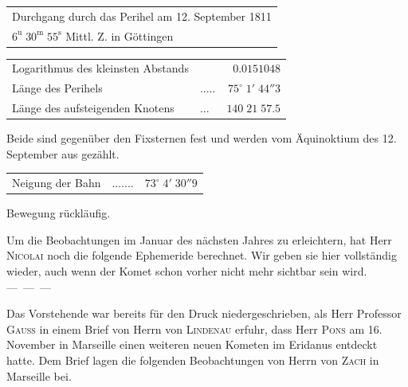 \begin{center}\fontsize{10}{12}\selectfont\setlength{\tabcolsep}{4pt}\renewcommand{\arraystretch}{1.15}\begin{tabular}{l}
Durchgang durch das Perihel am 12. September 1811\\
\quad $6^{\mathrm u}\;30^{\mathrm m}\;55^{\mathrm s}$ Mittl. Z. in Göttingen\\
\end{tabular}\end{center}
\begin{center}\fontsize{10}{12}\selectfont\setlength{\tabcolsep}{3pt}\renewcommand{\arraystretch}{1.15}\begin{tabular}{llr}
Logarithmus des kleinsten Abstands &  & $0.0151048$\\
Länge des Perihels & .\;.\;.\;.\;. & $75^\circ\;1'\;44''3$\\
Länge des aufsteigenden Knotens & .\;.\;. & $140\;21\;57.5$\\
\end{tabular}\end{center}
\noindent Beide sind gegenüber den Fixsternen fest und werden vom Äquinoktium des 12. September aus gezählt.
\begin{center}\fontsize{10}{12}\selectfont\setlength{\tabcolsep}{3pt}\renewcommand{\arraystretch}{1.15}\begin{tabular}{llr}
Neigung der Bahn & .\;.\;.\;.\;.\;.\;. & $73^\circ\;4'\;30''9$\\
\end{tabular}\end{center}
\noindent Bewegung rückläufig.

\par\indent Um die Beobachtungen im Januar des nächsten Jahres zu erleichtern, hat Herr \textsc{Nicolai} noch die folgende Ephemeride berechnet. Wir geben sie hier vollständig wieder, auch wenn der Komet schon vorher nicht mehr sichtbar sein wird. \mbox{--- --- ---}


\par\indent Das Vorstehende war bereits für den Druck niedergeschrieben, als Herr Professor \textsc{Gauß} in einem Brief von Herrn von \textsc{Lindenau} erfuhr, dass Herr \textsc{Pons} am 16. November in Marseille einen weiteren neuen Kometen im Eridanus entdeckt hatte. Dem Brief lagen die folgenden Beobachtungen von Herrn von \textsc{Zach} in Marseille bei.


